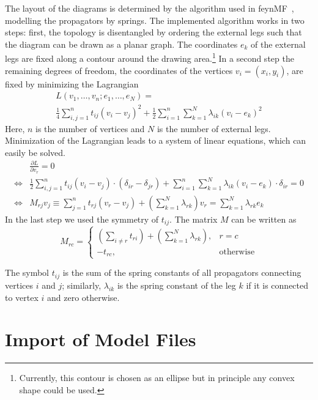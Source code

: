 \documentclass[11pt,a4paper]{refrep}
\begin{document}
The layout of the diagrams is determined by the algorithm used in
\textsf{feynMF}~\cite{Ohl:1995kr}, modelling the propagators by springs.
The implemented algorithm works in two steps: first, the topology is
disentangled by ordering the external legs such that the diagram can
be drawn as a planar graph. The coordinates $e_k$
of the external legs are
fixed along a contour around the drawing area.\footnote{Currently,
this contour is chosen as an ellipse but in principle any convex
shape could be used.}
In a second step the remaining degrees of freedom, the coordinates
of the vertices $v_i=(x_i, y_i)$, are fixed by minimizing the Lagrangian
\begin{multline}
L(v_1, \ldots, v_n; e_1, \ldots, e_N) =\\
 \frac14\sum_{i,j=1}^n t_{ij}\left(v_i-v_j\right)^2
+\frac12\sum_{i=1}^n\sum_{k=1}^N\lambda_{ik}\left(v_i-e_k\right)^2
\end{multline}
Here, $n$ is the number of vertices and $N$ is the number of external
legs.
Minimization of the Lagrangian leads to a system of linear equations, which
can easily be solved.
\begin{align*}
&\frac{\partial L}{\partial v_r}=0\\
\Leftrightarrow&
 \frac12\sum_{i,j=1}^n t_{ij}\left(v_i-v_j\right)
     \cdot\left(\delta_{ir}-\delta_{jr}\right)
+\sum_{i=1}^n\sum_{k=1}^N\lambda_{ik}\left(v_i-e_k\right)
     \cdot\delta_{ir}=0\\
\Leftrightarrow&
M_{rj}v_j\equiv
 \sum_{j=1}^n t_{rj}\left(v_r-v_j\right)
+\left(\sum_{k=1}^N\lambda_{rk}\right)v_r
=\sum_{k=1}^N\lambda_{rk}e_k
\end{align*}
In the last step we used the symmetry of $t_{ij}$.
The matrix $M$ can be written as
\begin{equation}
M_{rc}=\left\{\begin{array}{ll}
\left(\sum_{i\neq r}t_{ri}\right)+
\left(\sum_{k=1}^N\lambda_{rk}\right),&
r=c\\
-t_{rc},&\text{otherwise}
\end{array}\right.
\end{equation}

The symbol $t_{ij}$ is the sum of the spring constants of all
propagators connecting vertices $i$ and $j$; similarly, $\lambda_{ik}$
is the spring constant of the leg $k$ if it is connected to vertex $i$
and zero otherwise.

\section{Import of Model Files}
\label{sec:model}
\end{document}
